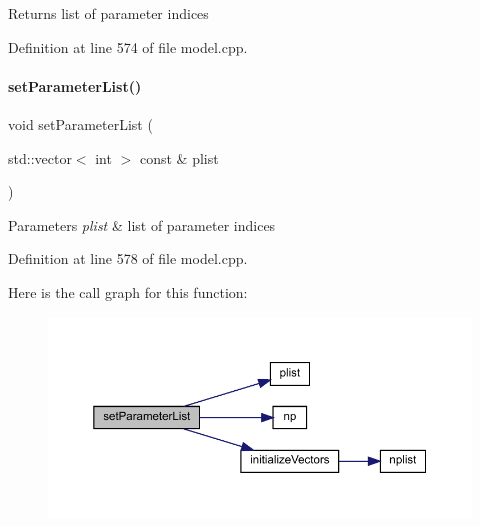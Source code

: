 \begin{DoxyReturn}{Returns}
list of parameter indices 
\end{DoxyReturn}


Definition at line 574 of file model.\+cpp.

\mbox{\label{classamici_1_1_model_a2afe974183e4bccaf746f6409941fe8f}} 
\paragraph{\texorpdfstring{set\+Parameter\+List()}{setParameterList()}}
{\footnotesize\ttfamily void set\+Parameter\+List (\begin{DoxyParamCaption}\item[{std\+::vector$<$ int $>$ const \&}]{plist }\end{DoxyParamCaption})}


\begin{DoxyParams}{Parameters}
{\em plist} & list of parameter indices \\
\hline
\end{DoxyParams}


Definition at line 578 of file model.\+cpp.

Here is the call graph for this function\+:
\nopagebreak
\begin{figure}[H]
\begin{center}
\leavevmode
\includegraphics[width=350pt]{classamici_1_1_model_a2afe974183e4bccaf746f6409941fe8f_cgraph}
\end{center}
\end{figure}
\mbox{\label{classamici_1_1_model_a34b007de55db268995bdc788accdc57d}} 
